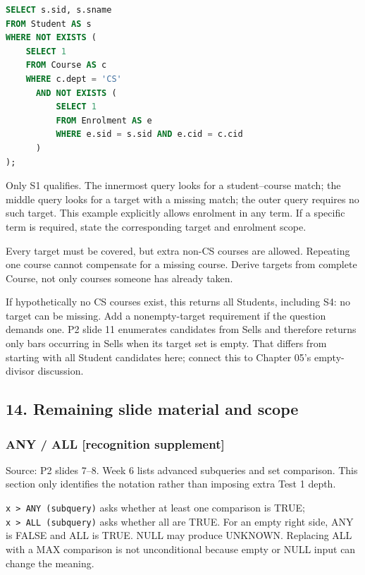 \Needspace{210pt}
\begin{lstlisting}[language=SQL]
SELECT s.sid, s.sname
FROM Student AS s
WHERE NOT EXISTS (
    SELECT 1
    FROM Course AS c
    WHERE c.dept = 'CS'
      AND NOT EXISTS (
          SELECT 1
          FROM Enrolment AS e
          WHERE e.sid = s.sid AND e.cid = c.cid
      )
);
\end{lstlisting}

Only S1 qualifies. The innermost query looks for a student--course match; the middle query looks for a target with a missing match; the outer query requires no such target. This example explicitly allows enrolment in any term. If a specific term is required, state the corresponding target and enrolment scope.

Every target must be covered, but extra non-CS courses are allowed. Repeating one course cannot compensate for a missing course. Derive targets from complete Course, not only courses someone has already taken.

If hypothetically no CS courses exist, this returns all Students, including S4: no target can be missing. Add a nonempty-target requirement if the question demands one. P2 slide 11 enumerates candidates from Sells and therefore returns only bars occurring in Sells when its target set is empty. That differs from starting with all Student candidates here; connect this to Chapter 05's empty-divisor discussion.

\subsection{14. Remaining slide material and scope}\label{06_sql_queries_en-remaining-slide-material-and-scope}

\subsubsection{ANY / ALL {[}recognition supplement{]}}\label{06_sql_queries_en-any-all-recognition-supplement}

Source: P2 slides 7--8. Week 6 lists advanced subqueries and set comparison. This section only identifies the notation rather than imposing extra Test 1 depth.

\texttt{x\ \textgreater{}\ ANY\ (subquery)} asks whether at least one comparison is TRUE; \texttt{x\ \textgreater{}\ ALL\ (subquery)} asks whether all are TRUE. For an empty right side, ANY is FALSE and ALL is TRUE. NULL may produce UNKNOWN. Replacing ALL with a MAX comparison is not unconditional because empty or NULL input can change the meaning.

